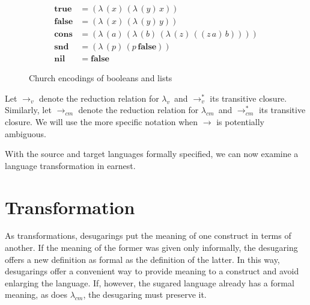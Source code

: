 \documentclass{llncs}
\newcommand{\cm}[0]{$\lambda_{cm}$}
\newcommand{\lv}[0]{$\lambda_v$}
\newcommand{\app}[2]{(#1\,#2)}
\newcommand{\abs}[2]{(\lambda\,(#1)\,#2)}
\newcommand{\lvrr}[0]{\rightarrow_v}
\newcommand{\lvrrs}[0]{\rightarrow_v^{*}}
\newcommand{\cmrr}[0]{\rightarrow_{cm}}
\newcommand{\cmrrs}[0]{\rightarrow_{cm}^{*}}
\begin{document}

\newcommand{\true}{\mathbf{true}}
\newcommand{\false}{\mathbf{false}}
\newcommand{\nil}{\mathbf{nil}}
\newcommand{\cons}[2]{((\mathbf{cons}\,#1)\,#2)}
\newcommand{\eval}[1]{\overline{#1}}

\begin{figure}
\label{church-encodings}
\begin{align*}
\true         &= \abs{x}{\abs{y}{x}}\\
\false        &= \abs{x}{\abs{y}{y}}\\
\mathbf{cons} &= \abs{a}{\abs{b}{\abs{z}{\app{\app{z}{a}}{b}}}}\\
\mathbf{snd}  &= \abs{p}{\app{p}{\false}}\\
\nil          &= \false
\end{align*}
\caption{Church encodings of booleans and lists}
\end{figure}


Let $\lvrr$ denote the reduction relation for \lv\ and $\lvrrs$ its transitive closure. Similarly, let $\cmrr$ denote the reduction relation for \cm\ and $\cmrrs$ its transitive closure. We will use the more specific notation when $\rightarrow$ is potentially ambiguous.

With the source and target languages formally specified, we can now examine a language transformation in earnest.

\section{Transformation}
\label{sec-transformation}

As transformations, desugarings put the meaning of one construct in terms of another. If the meaning of the former was given only informally, the desugaring offers a new definition as formal as the definition of the latter. In this way, desugarings offer a convenient way to provide meaning to a construct and avoid enlarging the language. If, however, the sugared language already has a formal meaning, as does \cm, the desugaring must preserve it.
\end{document}
